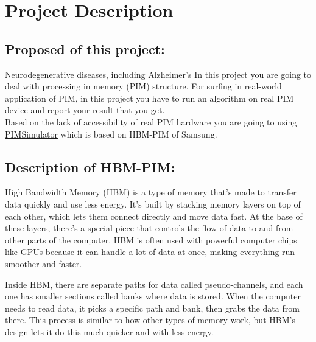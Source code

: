 \documentclass[12pt]{article}
\begin{document}
\tableofcontents

\newpage


\section{Project Description}

\subsection{Proposed of this project:}
Neurodegenerative diseases, including Alzheimer's In this project you are going to deal with processing in memory (PIM) structure. For surfing in real-world application of PIM, in this project you have to run an algorithm on real PIM device and report your result that you get.\\
Based on the lack of accessibility of real PIM hardware you are going to using \href{https://github.com/SAITPublic/PIMSimulator}{PIMSimulator} which is based on HBM-PIM of Samsung.


\subsection{Description of HBM-PIM:}
High Bandwidth Memory (HBM) is a type of memory that's made to transfer data quickly and use less energy. It's built by stacking memory layers on top of each other, which lets them connect directly and move data fast. At the base of these layers, there's a special piece that controls the flow of data to and from other parts of the computer. HBM is often used with powerful computer chips like GPUs because it can handle a lot of data at once, making everything run smoother and faster.

Inside HBM, there are separate paths for data called pseudo-channels, and each one has smaller sections called banks where data is stored. When the computer needs to read data, it picks a specific path and bank, then grabs the data from there. This process is similar to how other types of memory work, but HBM's design lets it do this much quicker and with less energy.
\end{document}
